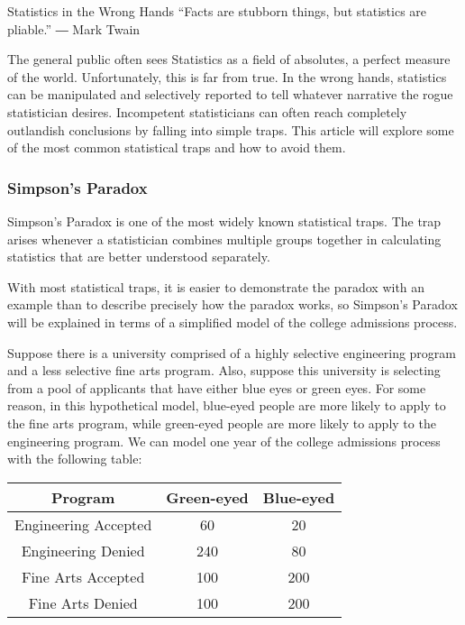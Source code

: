
Statistics in the Wrong Hands
“Facts are stubborn things, but statistics are pliable.”
― Mark Twain

The general public often sees Statistics as a field of absolutes, a perfect measure of the world. Unfortunately, this is far from true. In the wrong hands, statistics can be manipulated and selectively reported to tell whatever narrative the rogue statistician desires. Incompetent statisticians can often reach completely outlandish conclusions by falling into simple traps. This article will explore some of the most common statistical traps and how to avoid them.

\subsubsection*{Simpson’s Paradox}

Simpson’s Paradox is one of the most widely known statistical traps. The trap arises whenever a statistician combines multiple groups together in calculating statistics that are better understood separately.

With most statistical traps, it is easier to demonstrate the paradox with an example than to describe precisely how the paradox works, so Simpson’s Paradox will be explained in terms of a simplified model of the college admissions process.

Suppose there is a university comprised of a highly selective engineering program and a less selective fine arts program. Also, suppose this university is selecting from a pool of applicants that have either blue eyes or green eyes. For some reason, in this hypothetical model, blue-eyed people are more likely to apply to the fine arts program, while green-eyed people are more likely to apply to the engineering program. We can model one year of the college admissions process with the following table:

\begin{center}
\begin{tabular}{c c c}
\toprule
Program & Green-eyed & Blue-eyed \\
\midrule
Engineering Accepted & 60 & 20 \\
Engineering Denied & 240 & 80 \\
Fine Arts Accepted & 100 & 200 \\
Fine Arts Denied & 100 & 200 \\
\bottomrule
\end{tabular}
\end{center}

